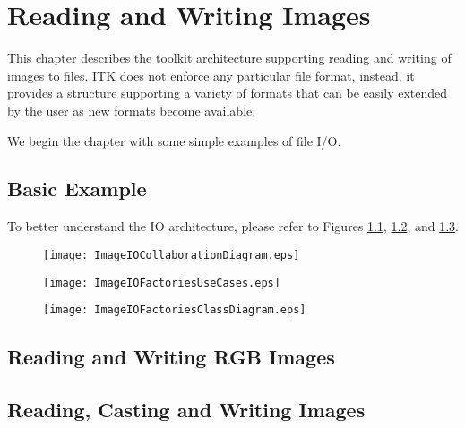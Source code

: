

\chapter{Reading and Writing Images}
\label{sec:IO}

This chapter describes the toolkit architecture supporting reading and
writing of images to files. ITK does not enforce any particular file format,
instead, it provides a structure supporting a variety of formats that can
be easily extended by the user as new formats become available.

We begin the chapter with some simple examples of file I/O.

\section{Basic Example}
\label{sec:ImagReadWrite}


To better understand the IO architecture, please refer to Figures 
\ref{fig:ImageIOCollaborationDiagram}, 
\ref{fig:ImageIOFactoriesUseCases}, and
\ref{fig:ImageIOFactoriesClassDiagram}. 

\begin{figure}
\center
\texttt{[image: ImageIOCollaborationDiagram.eps]}
 \label{fig:ImageIOCollaborationDiagram}
\end{figure}

\begin{figure}
\center
\texttt{[image: ImageIOFactoriesUseCases.eps]}
\label{fig:ImageIOFactoriesUseCases}
\end{figure}

\begin{figure}
\center
\texttt{[image: ImageIOFactoriesClassDiagram.eps]}
\label{fig:ImageIOFactoriesClassDiagram}
\end{figure}

\section{Reading and Writing RGB Images}
\label{sec:RGBImagReadWrite}


\section{Reading, Casting and Writing Images}
\label{sec:ImagReadCastWrite}


